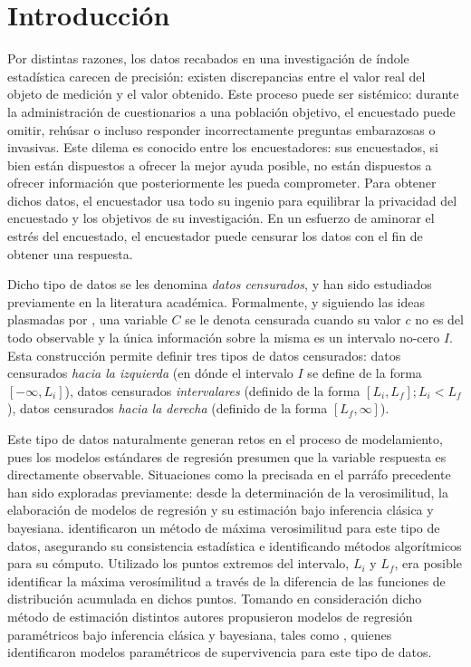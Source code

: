 \chapter{Introducción}
Por distintas razones, los datos recabados en una investigación de índole estadística carecen de precisión: existen discrepancias entre el valor real del objeto de medición y el valor obtenido. Este proceso puede ser sistémico: durante la administración de cuestionarios a una población objetivo, el encuestado puede omitir, rehúsar o incluso responder incorrectamente preguntas embarazosas o invasivas. Este dilema es conocido entre los encuestadores: sus encuestados, si bien están dispuestos a ofrecer la mejor ayuda posible, no están dispuestos a ofrecer información que posteriormente les pueda comprometer. Para obtener dichos datos, el encuestador usa todo su ingenio para equilibrar la privacidad del encuestado y los objetivos de su investigación. En un esfuerzo de aminorar el estrés del encuestado, el encuestador puede censurar los datos con el fin de obtener una respuesta.

Dicho tipo de datos se les denomina \textit{datos censurados}, y han sido estudiados previamente en la literatura académica. Formalmente, y siguiendo las ideas plasmadas por \cite{peto:p}, una variable $C$ se le denota censurada cuando su valor $c$ no es del todo observable y la única información sobre la misma es un intervalo no-cero $I$. Esta construcción permite definir tres tipos de datos censurados: datos censurados \textit{hacia la izquierda} (en dónde el intervalo $I$ se define de la forma $[-\infty,L_i]$), datos censurados \textit{intervalares} (definido de la forma $[L_i, L_f]; L_i < L_f$), datos censurados \textit{hacia la derecha} (definido de la forma $[L_f, \infty]$). 

Este tipo de datos naturalmente generan retos en el proceso de modelamiento, pues los modelos estándares de regresión presumen que la variable respuesta es directamente observable. Situaciones como la precisada en el parráfo precedente han sido exploradas previamente: desde la determinación de la verosimilitud, la elaboración de modelos de regresión y su estimación bajo inferencia clásica y bayesiana. \cite{gentleman:lmk} identificaron un método de máxima verosimilitud para este tipo de datos, asegurando su consistencia estadística e identificando métodos algorítmicos para su cómputo. Utilizado los puntos extremos del intervalo, $L_i$ y $L_f$, era posible identificar la máxima verosímilitud a través de la diferencia de las funciones de distribución acumulada en dichos puntos. Tomando en consideración dicho método de estimación distintos autores propusieron modelos de regresión paramétricos bajo inferencia clásica y bayesiana, tales como \cite{mun:xu}, quienes identificaron modelos paramétricos de supervivencia para este tipo de datos.

